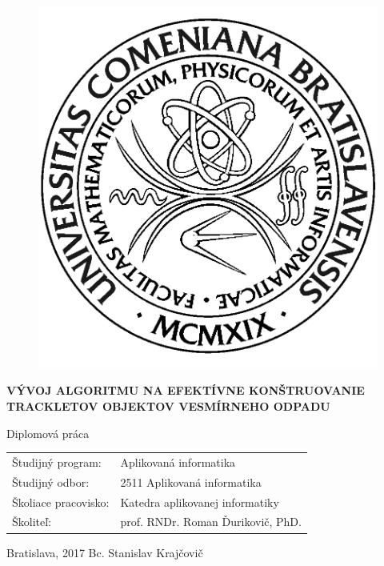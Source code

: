 \documentclass[12pt, a4paper, oneside]{book}
\newcommand\mftitle{Vývoj algoritmu na efektívne konštruovanie trackletov objektov vesmírneho odpadu}
\newcommand\mfthesistype{Diplomová práca}
\newcommand\mfauthor{Bc. Stanislav Krajčovič}
\newcommand\mfadvisor{prof. RNDr. Roman Ďurikovič, PhD.}
\newcommand\mfplacedate{Bratislava, 2017}
\begin{document}
\vfill
\begin{figure}[!hbt]
\begin{center}
\includegraphics{images/logo_fmph}
\label{img:logo}
\end{center}
\end{figure}
\begin{center}
\begin{minipage}{0.8\textwidth}
\centerline{\textbf{\Large\MakeUppercase{\mftitle}}}
\smallskip
\centerline{\mfthesistype}
\end{minipage}
\end{center}
\vfill
\begin{tabular}{l l}
Študijný program: & Aplikovaná informatika\\
Študijný odbor: & 2511 Aplikovaná informatika\\
Školiace pracovisko: & Katedra aplikovanej informatiky\\
Školiteľ: & \mfadvisor
\end{tabular}
\vfill
\noindent
\mfplacedate \hfill
\mfauthor
\eject 

\thispagestyle{empty}
\end{document}
